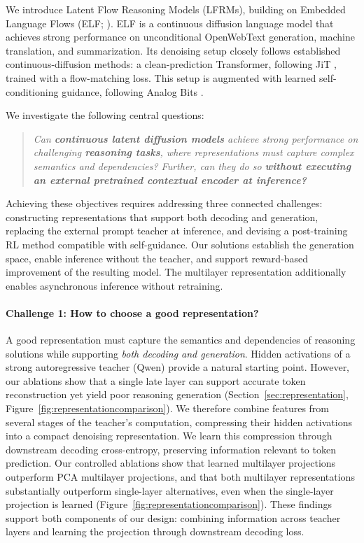 \documentclass{article}
\newcommand{\rev}[1]{{\color{blue}#1}}
\newcommand{\revp}[1]{\par\color{blue}#1\par\color{black}}
\begin{document}
\revp{We introduce Latent Flow Reasoning Models (LFRMs), building on Embedded Language Flows (ELF; \citealp{elf}). ELF is a continuous diffusion language model that achieves strong performance on unconditional OpenWebText generation, machine translation, and summarization. Its denoising setup closely follows established continuous-diffusion methods: a clean-prediction Transformer, following JiT \citep{jit}, trained with a flow-matching loss. This setup is augmented with learned self-conditioning guidance, following Analog Bits \citep{analogbits}.}
\rev{We investigate the following central questions:}
\begin{quote}
\rev{\emph{Can \textbf{continuous latent diffusion models} achieve strong
performance on challenging \textbf{reasoning tasks}, where representations
must capture complex semantics and dependencies? Further, can they
do so \textbf{without executing an external pretrained contextual encoder
at inference?}}}
\end{quote}

\revp{Achieving these objectives requires addressing three connected
challenges: constructing representations that support both decoding
and generation, replacing the external prompt teacher at inference,
and devising a post-training RL method compatible with self-guidance.
Our solutions establish the generation space, enable inference
without the teacher, and support reward-based improvement of the
resulting model. The multilayer representation additionally enables
asynchronous inference without retraining.}

\paragraph{\rev{Challenge 1: How to choose a good representation?}}
\rev{A good representation must capture the semantics and dependencies of reasoning solutions while supporting \emph{both decoding and generation}. Hidden activations of a strong autoregressive teacher (Qwen) provide a natural starting point. However, our ablations show that a single late layer can support accurate token reconstruction yet yield poor reasoning generation (Section~\ref{sec:representation}, Figure~\ref{fig:representationcomparison}). We therefore combine features from several stages of the teacher's computation, compressing their hidden activations into a compact denoising representation. We learn this compression through downstream decoding cross-entropy, preserving information relevant to token prediction. Our controlled ablations show that learned multilayer projections outperform PCA multilayer projections, and that both multilayer representations substantially outperform single-layer alternatives, even when the single-layer projection is learned (Figure~\ref{fig:representationcomparison}). These findings support both components of our design: combining information across teacher layers and learning the projection through downstream decoding loss.}
\end{document}
